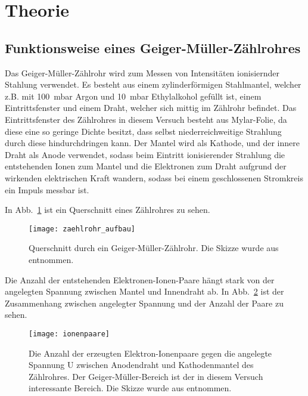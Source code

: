 
\section{Theorie}
\subsection{Funktionsweise eines Geiger-Müller-Zählrohres}
%
Das Geiger-Müller-Zählrohr wird zum Messen von Intensitäten ionisiernder
Stahlung verwendet. Es besteht aus einem zylinderförmigen Stahlmantel,
welcher z.B. mit \SI{100}{\milli\bar} Argon und \SI{10}{\milli\bar}
Ethylalkohol gefüllt ist, einem Eintrittsfenster und einem Draht,
welcher sich mittig im Zählrohr befindet. Das Eintrittsfenster des
Zählrohres in diesem Versuch besteht aus Mylar-Folie, da diese eine so
geringe Dichte besitzt, dass selbst niederreichweitige Strahlung durch
diese hindurchdringen kann.  Der Mantel wird als Kathode, und der innere
Draht als Anode verwendet, sodass beim Eintritt ionisierender Strahlung
die entstehenden Ionen zum Mantel und die Elektronen zum Draht aufgrund
der wirkenden elektrischen Kraft wandern, sodass bei einem geschlossenen
Stromkreis ein Impuls messbar ist.

In Abb.~\ref{fig:zaehlrohr_aufbau} ist ein Querschnitt eines Zählrohres
zu sehen.
%
\begin{figure}
  \centering
  \texttt{[image: zaehlrohr\_aufbau]}
  \caption{Querschnitt durch ein Geiger-Müller-Zählrohr.
               Die Skizze wurde aus \textcite{v703} entnommen.}
  \label{fig:zaehlrohr_aufbau}
\end{figure}
%

Die Anzahl der entstehenden Elektronen-Ionen-Paare hängt stark von der
angelegten Spannung zwischen Mantel und Innendraht ab.  In
Abb.~\ref{fig:ionenpaare} ist der Zusammenhang zwischen angelegter
Spannung und der Anzahl der Paare zu sehen.
%
\begin{figure}
  \centering
  \texttt{[image: ionenpaare]}
  \caption{Die Anzahl der erzeugten Elektron-Ionenpaare gegen die
    angelegte Spannung U zwischen Anodendraht und Kathodenmantel des
    Zählrohres. Der Geiger-Müller-Bereich ist der in diesem Versuch
    interessante Bereich.  Die Skizze wurde aus \textcite{v703}
    entnommen.}
  \label{fig:ionenpaare}
\end{figure}
